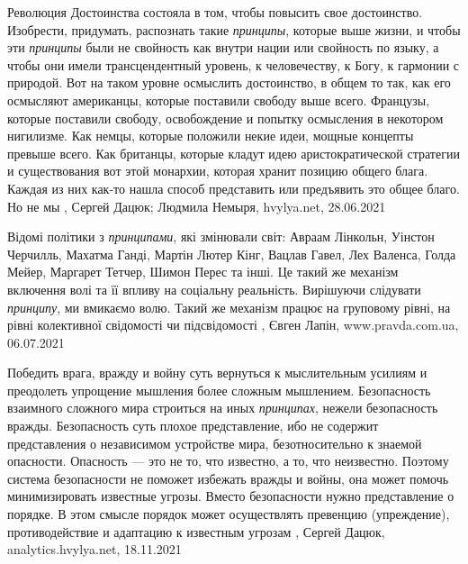 Революция Достоинства состояла в том, чтобы повысить свое достоинство.
Изобрести, придумать, распознать такие \emph{принципы}, которые выше жизни, и
чтобы эти \emph{принципы} были не свойность как внутри нации или свойность по
языку, а чтобы они имели трансцендентный уровень, к человечеству, к Богу, к
гармонии с природой. Вот на таком уровне осмыслить достоинство, в общем то так,
как его осмысляют американцы, которые поставили свободу выше всего. Французы,
которые поставили свободу, освобождение и попытку осмысления в некотором
нигилизме. Как немцы, которые положили некие идеи, мощные концепты превыше
всего. Как британцы, которые кладут идею аристократической стратегии и
существования вот этой монархии, которая хранит позицию общего блага. Каждая из
них как-то нашла способ представить или предъявить это общее благо. Но не мы
, 
Сергей Дацюк; Людмила Немыря, hvylya.net, 28.06.2021

Відомі політики з \emph{принципами}, які змінювали світ: Авраам Лінкольн,
Уінстон Черчилль, Махатма Ганді, Мартін Лютер Кінг, Вацлав Гавел, Лех Валенса,
Голда Мейер, Маргарет Тетчер, Шимон Перес та інші. Це такий же механізм
включення волі та її впливу на соціальну реальність.  Вирішуючи слідувати
\emph{принципу}, ми вмикаємо волю.  Такий же механізм працює на груповому
рівні, на рівні колективної свідомості чи підсвідомості
, 
Євген Лапін, www.pravda.com.ua, 06.07.2021

Победить врага, вражду и войну суть вернуться к мыслительным усилиям и
преодолеть упрощение мышления более сложным мышлением.  Безопасность взаимного
сложного мира строиться на иных \emph{принципах}, нежели безопасность вражды.
Безопасность суть плохое представление, ибо не содержит представления о
независимом устройстве мира, безотносительно к знаемой опасности.  Опасность —
это не то, что известно, а то, что неизвестно. Поэтому система безопасности не
поможет избежать вражды и войны, она может помочь минимизировать известные
угрозы.  Вместо безопасности нужно представление о порядке. В этом смысле
порядок может осуществлять превенцию (упреждение), противодействие и адаптацию
к известным угрозам
, Сергей Дацюк, analytics.hvylya.net, 18.11.2021
